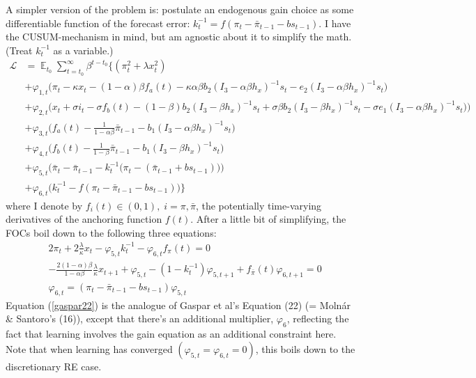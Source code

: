 \documentclass[11pt]{article}
\renewcommand{\[}{\begin{equation}}
\renewcommand{\]}{\end{equation}}
\DeclareMathOperator{\E}{\mathbb{E}}
\begin{document}
A simpler version of the problem is: postulate an endogenous gain choice as some differentiable function of the forecast error: $k_t^{-1} = f(\pi_t - \bar{\pi}_{t-1}-b s_{t-1})$. I have the CUSUM-mechanism in mind, but am agnostic about it to simplify the math. (Treat $k_t^{-1}$ as a variable.)
 \begin{align}
\mathcal{L} &= \E_{t_0}\sum_{t=t_0}^{\infty} \beta^{t-t_0}\bigg\{  (\pi_t^2  + \lambda x_t^2 )  \\
 & + \varphi_{1,t} \bigg(\pi_t - \kappa x_t -(1-\alpha)\beta f_a(t) -\kappa\alpha\beta b_2 (I_3 - \alpha\beta h_x)^{-1}s_t - e_2(I_3 - \alpha\beta h_x)^{-1}s_t \bigg) \\
 & + \varphi_{2,t} \bigg(x_t + \sigma i_t -\sigma f_b(t)  -  (1-\beta)b_2 (I_3 - \beta h_x)^{-1}s_t + \sigma\beta b_2 (I_3 - \beta h_x)^{-1}s_t -\sigma e_1(I_3 - \alpha\beta h_x)^{-1}s_t  \big)\bigg) \\
 & +  \varphi_{3,t}  \bigg(f_a(t) - \frac{1}{1-\alpha\beta}\bar{\pi}_{t-1}  - b_1(I_3 - \alpha\beta h_x)^{-1}s_t  \bigg) \\
 & + \varphi_{4,t}  \bigg(f_b(t) - \frac{1}{1-\beta}\bar{\pi}_{t-1}  - b_1(I_3 - \beta h_x)^{-1}s_t \bigg)  \\
  & + \varphi_{5,t}  \bigg(  \bar{\pi}_{t} - \bar{\pi}_{t-1} - k_t^{-1}\big(\pi_{t} -(\bar{\pi}_{t-1}+bs_{t-1}) \big)   \bigg)  \\
  & + \varphi_{6,t}  \bigg(k_t^{-1} - f(\pi_t - \bar{\pi}_{t-1}-b s_{t-1})  \bigg)
  \bigg\}
\end{align}
where I denote by $f_i(t) \in (0,1), \; i=\pi, \bar{\pi}$, the potentially time-varying derivatives of the anchoring function $f(t)$. After a little bit of simplifying, the FOCs boil down to the following three equations:
\begin{align}
& 2\pi_t + 2\frac{\lambda}{\kappa}x_t -\varphi_{5,t} k_t^{-1} - \varphi_{6,t} f_{\pi}(t) = 0 \label{gaspar22}\\
& -\frac{2(1-\alpha)\beta}{1-\alpha\beta}\frac{\lambda}{\kappa}x_{t+1} + \varphi_{5,t} -(1-k_t^{-1})\varphi_{5,t+1} +f_{\bar{\pi}}(t)\varphi_{6,t+1} = 0 \label{gaspar21}\\
& \varphi_{6,t} = (\pi_t - \bar{\pi}_{t-1}-b s_{t-1}) \varphi_{5,t} \label{constraints}
\end{align}
Equation (\ref{gaspar22}) is the analogue of Gaspar et al's Equation (22) (= Moln\'ar \& Santoro's (16)), except that there's an additional multiplier, $\varphi_6$, reflecting the fact that learning involves the gain equation as an additional constraint here. Note that when learning has converged $(\varphi_{5,t}=\varphi_{6,t}=0)$, this boils down to the discretionary RE case. \\
\end{document}
